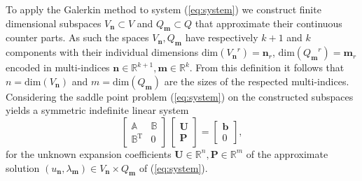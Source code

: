 \documentclass{marine_2015}
\newcommand{\Uvec}{\ensuremath{\mathbf{U}}}
\newcommand{\Pvec}{\ensuremath{\mathbf{P}}}
\newcommand{\Vh}{\ensuremath{V_{\mathbf{n}}}}
\newcommand{\Qh}{\ensuremath{Q_{\mathbf{m}}}}
\begin{document}
To apply the Galerkin method to system (\ref{eq:system}) we construct finite dimensional
subspaces $\Vh\subset V$ and $\Qh\subset Q$ that approximate their continuous
counter parts. As such the spaces $\Vh, \Qh$ have respectively $k+1$ and $k$
components with their individual dimensions
$\text{dim}\left(\Vh^r\right)=\mathbf{n}_r$, $\text{dim}\left(\Qh^r\right)=\mathbf{m}_r$ 
encoded in multi-indices $\mathbf{n}\in\mathbb{R}^{k+1}, \mathbf{m}\in\mathbb{R}^k$.
From this definition it follows that $n=\text{dim}\left(\Vh\right)$ and $m=\text{dim}\left(\Qh\right)$
are the sizes of the respected multi-indices. Considering the saddle point
problem (\ref{eq:system}) on the constructed subspaces yields a symmetric
indefinite linear system
\[
  \label{eq:sysAB}
    \begin{bmatrix}
      \mathbb{A} & \mathbb{B} \\
      \mathbb{B}^{\text{T}} & 0
    \end{bmatrix}
    \,
    \begin{bmatrix}
      \mathbf{U} \\
      \mathbf{P}
    \end{bmatrix}
    =
    \begin{bmatrix}
      \mathbf{b}\\
      0
    \end{bmatrix},
\]
for the unknown expansion coefficients $\Uvec\in\mathbb{R}^n,
\Pvec\in\mathbb{R}^m$ of the approximate solution
$\left(u_\mathbf{n}, \lambda_{\mathbf{m}}\right)\in \Vh \times \Qh$ of
(\ref{eq:system}).
\end{document}
